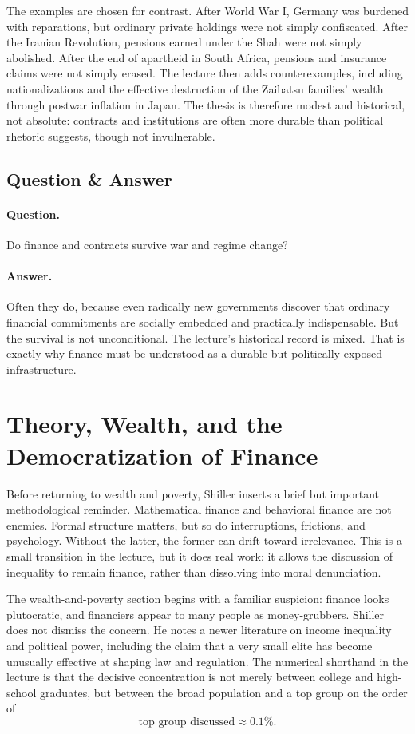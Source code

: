 The examples are chosen for contrast. After World War I, Germany was burdened with reparations, but ordinary private holdings were not simply confiscated. After the Iranian Revolution, pensions earned under the Shah were not simply abolished. After the end of apartheid in South Africa, pensions and insurance claims were not simply erased. The lecture then adds counterexamples, including nationalizations and the effective destruction of the Zaibatsu families' wealth through postwar inflation in Japan. The thesis is therefore modest and historical, not absolute: contracts and institutions are often more durable than political rhetoric suggests, though not invulnerable.

\subsection{Question \& Answer}

\paragraph{Question.} Do finance and contracts survive war and regime change?

\paragraph{Answer.} Often they do, because even radically new governments discover that ordinary financial commitments are socially embedded and practically indispensable. But the survival is not unconditional. The lecture's historical record is mixed. That is exactly why finance must be understood as a durable but politically exposed infrastructure.

\section{Theory, Wealth, and the Democratization of Finance}

Before returning to wealth and poverty, Shiller inserts a brief but important methodological reminder. Mathematical finance and behavioral finance are not enemies. Formal structure matters, but so do interruptions, frictions, and psychology. Without the latter, the former can drift toward irrelevance. This is a small transition in the lecture, but it does real work: it allows the discussion of inequality to remain finance, rather than dissolving into moral denunciation.

The wealth-and-poverty section begins with a familiar suspicion: finance looks plutocratic, and financiers appear to many people as money-grubbers. Shiller does not dismiss the concern. He notes a newer literature on income inequality and political power, including the claim that a very small elite has become unusually effective at shaping law and regulation. The numerical shorthand in the lecture is that the decisive concentration is not merely between college and high-school graduates, but between the broad population and a top group on the order of
\begin{equation}
\text{top group discussed} \approx 0.1\%.
\end{equation}

